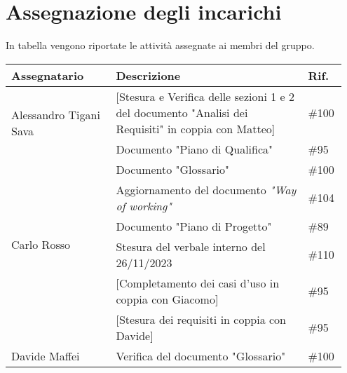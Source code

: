 \section{Assegnazione degli incarichi}
In tabella vengono riportate le attività assegnate ai membri del gruppo.
\begin{center}
	{
		\renewcommand{\arraystretch}{1.5}
		\begin{tabular}{p{0.30\linewidth}|p{0.55\linewidth}|p{0.10\linewidth}}
			\textbf{Assegnatario}                   & \textbf{Descrizione}                                                                                    & \textbf{Rif.} \\
			\hline
			\multirow{2}{*}{Alessandro Tigani Sava} & [Stesura e Verifica delle sezioni 1 e 2 del documento "Analisi dei Requisiti" in coppia con Matteo]     & \#100         \\
			\cline{2-3}
			                                        & Documento "Piano di Qualifica"                                                                          & \#95          \\
			\cline{2-3}
			                                        & Documento "Glossario"                                                                                   & \#100         \\
			\cline{2-3}
			                                        & Aggiornamento del documento \textit{"Way of working"}                                                   & \#104         \\
			\hline
			\multirow{2}{*}{Carlo Rosso}            & Documento "Piano di Progetto"                                                                           & \#89          \\
			\cline{2-3}
			                                        & Stesura del verbale interno del 26/11/2023                                                              & \#110         \\
			\cline{2-3}
			                                        & [Completamento dei casi d'uso in coppia con Giacomo]                                                    & \#95          \\
			\cline{2-3}
			                                        & [Stesura dei requisiti in coppia con Davide]                                                            & \#95          \\
			\hline
			\multirow{2}{*}{Davide Maffei}          & Verifica del documento "Glossario"                                                                      & \#100         \\

\end{tabular}}
\end{center}
